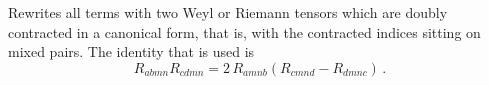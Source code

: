 
Rewrites all terms with 
two Weyl or Riemann tensors which are doubly contracted in a
canonical form, that is, with the contracted indices sitting on mixed
pairs. The identity that is used is
\begin{equation}
R_{a b m n} R_{c d m n} 
 = 2\, R_{a m n b} ( R_{c m n d} - R_{d m n c} )\, .
\end{equation}
